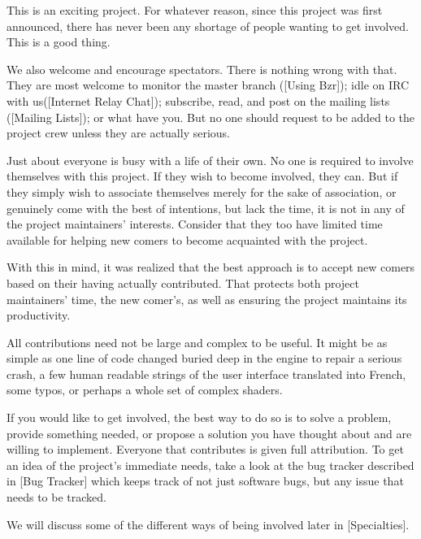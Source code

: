 
This is an exciting project. For whatever reason, since this project was first announced, there has never been any shortage of people wanting to get involved. This is a good thing. 

We also welcome and encourage spectators. There is nothing wrong with that. They are most welcome to monitor the master branch ([Using Bzr]); idle on IRC with us([Internet Relay Chat]); subscribe, read, and post on the mailing lists ([Mailing Lists]); or what have you. But no one should request to be added to the project crew unless they are actually serious.

Just about everyone is busy with a life of their own. No one is required to involve themselves with this project. If they wish to become involved, they can. But if they simply wish to associate themselves merely for the sake of association, or genuinely come with the best of intentions, but lack the time, it is not in any of the project maintainers' interests. Consider that they too have limited time available for helping new comers to become acquainted with the project.

With this in mind, it was realized that the best approach is to accept new comers based on their having actually contributed. That protects both project maintainers' time, the new comer's, as well as ensuring the project maintains its productivity.

All contributions need not be large and complex to be useful. It might be as simple as one line of code changed buried deep in the engine to repair a serious crash, a few human readable strings of the user interface translated into French, some typos, or perhaps a whole set of complex shaders.

If you would like to get involved, the best way to do so is to solve a problem, provide something needed, or propose a solution you have thought about and are willing to implement. Everyone that contributes is given full attribution. To get an idea of the project's immediate needs, take a look at the bug tracker described in [Bug Tracker] which keeps track of not just software bugs, but any issue that needs to be tracked.

We will discuss some of the different ways of being involved later in [Specialties].

